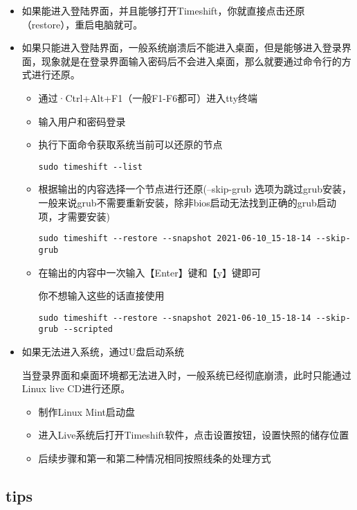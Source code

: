 \documentclass[
]{book}
\providecommand{\tightlist}{%
  \setlength{\itemsep}{0pt}\setlength{\parskip}{0pt}}
\begin{document}
\begin{itemize}
\item
  如果能进入登陆界面，并且能够打开Timeshift，你就直接点击还原（restore），重启电脑就可。
\item
  如果只能进入登陆界面，一般系统崩溃后不能进入桌面，但是能够进入登录界面，现象就是在登录界面输入密码后不会进入桌面，那么就要通过命令行的方式进行还原。

  \begin{itemize}
  \item
    通过·Ctrl+Alt+F1（一般F1-F6都可）进入tty终端
  \item
    输入用户和密码登录
  \item
    执行下面命令获取系统当前可以还原的节点

    \texttt{sudo\ timeshift\ -\/-list}
  \item
    根据输出的内容选择一个节点进行还原(--skip-grub 选项为跳过grub安装，一般来说grub不需要重新安装，除非bios启动无法找到正确的grub启动项，才需要安装)

    \texttt{sudo\ timeshift\ -\/-restore\ -\/-snapshot\ \textquotesingle{}2021-06-10\_15-18-14\textquotesingle{}\ -\/-skip-grub}
  \item
    在输出的内容中一次输入【Enter】键和【y】键即可

    你不想输入这些的话直接使用

    \texttt{sudo\ timeshift\ -\/-restore\ -\/-snapshot\ \textquotesingle{}2021-06-10\_15-18-14\textquotesingle{}\ -\/-skip-grub\ -\/-scripted}
  \end{itemize}
\item
  如果无法进入系统，通过U盘启动系统

  当登录界面和桌面环境都无法进入时，一般系统已经彻底崩溃，此时只能通过Linux live CD进行还原。

  \begin{itemize}
  \tightlist
  \item
    制作Linux Mint启动盘
  \item
    进入Live系统后打开Timeshift软件，点击设置按钮，设置快照的储存位置
  \item
    后续步骤和第一和第二种情况相同按照线条的处理方式
  \end{itemize}
\end{itemize}

\hypertarget{tips}{%
\subsection{tips}\label{tips}}
\end{document}
